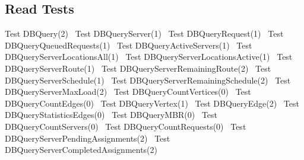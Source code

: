 \documentclass{article}
\begin{document}
\subsection{Read Tests}
\label{sec:read-tests}
\nwenddocs{}\endmoddef{}
\LA{}Test \code{}DBQuery\edoc{}(2)~{\nwtagstyle{}}\RA{}
\LA{}Test \code{}DBQueryServer\edoc{}(1)~{\nwtagstyle{}}\RA{}
\LA{}Test \code{}DBQueryRequest\edoc{}(1)~{\nwtagstyle{}}\RA{}
\LA{}Test \code{}DBQueryQueuedRequests\edoc{}(1)~{\nwtagstyle{}}\RA{}
\LA{}Test \code{}DBQueryActiveServers\edoc{}(1)~{\nwtagstyle{}}\RA{}
\LA{}Test \code{}DBQueryServerLocationsAll\edoc{}(1)~{\nwtagstyle{}}\RA{}
\LA{}Test \code{}DBQueryServerLocationsActive\edoc{}(1)~{\nwtagstyle{}}\RA{}
\LA{}Test \code{}DBQueryServerRoute\edoc{}(1)~{\nwtagstyle{}}\RA{}
\LA{}Test \code{}DBQueryServerRemainingRoute\edoc{}(2)~{\nwtagstyle{}}\RA{}
\LA{}Test \code{}DBQueryServerSchedule\edoc{}(1)~{\nwtagstyle{}}\RA{}
\LA{}Test \code{}DBQueryServerRemainingSchedule\edoc{}(2)~{\nwtagstyle{}}\RA{}
\LA{}Test \code{}DBQueryServerMaxLoad\edoc{}(2)~{\nwtagstyle{}}\RA{}
\LA{}Test \code{}DBQueryCountVertices\edoc{}(0)~{\nwtagstyle{}}\RA{}
\LA{}Test \code{}DBQueryCountEdges\edoc{}(0)~{\nwtagstyle{}}\RA{}
\LA{}Test \code{}DBQueryVertex\edoc{}(1)~{\nwtagstyle{}}\RA{}
\LA{}Test \code{}DBQueryEdge\edoc{}(2)~{\nwtagstyle{}}\RA{}
\LA{}Test \code{}DBQueryStatisticsEdges\edoc{}(0)~{\nwtagstyle{}}\RA{}
\LA{}Test \code{}DBQueryMBR\edoc{}(0)~{\nwtagstyle{}}\RA{}
\LA{}Test \code{}DBQueryCountServers\edoc{}(0)~{\nwtagstyle{}}\RA{}
\LA{}Test \code{}DBQueryCountRequests\edoc{}(0)~{\nwtagstyle{}}\RA{}
\LA{}Test \code{}DBQueryServerPendingAssignments\edoc{}(2)~{\nwtagstyle{}}\RA{}
\LA{}Test \code{}DBQueryServerCompletedAssignments\edoc{}(2)~{\nwtagstyle{}}\RA{}
\end{document}

